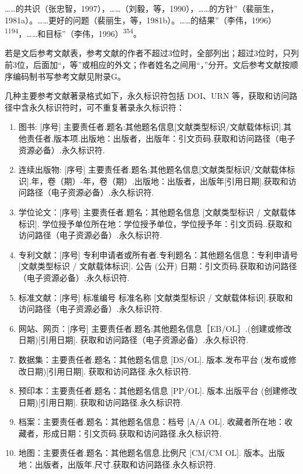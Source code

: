 ……的共识（张忠智，1997），……（刘毅，等，1990），……的方针”（裴丽生，1981a）。……更好的问题（裴丽生，等，1981b）。……的结果”（李伟，1996）\textsuperscript{1194}，……和目标”（李伟，1996）\textsuperscript{354}。

若是文后参考文献表，参考文献的作者不超过3位时，全部列出；超过3位时，只列前3位，后面加“，等”或相应的外文；作者姓名之间用“，”分开。文后参考文献按顺序编码制书写参考文献见附录G。

几种主要参考文献著录格式如下，永久标识符包括 DOI、URN 等，获取和访问路径中含永久标识符时，可不重复著录永久标识符：

\begin{enumerate}
    \item 图书: [序号] 主要责任者.题名:其他题名信息[文献类型标识/文献载体标识].其他责任者.版本项.出版地：出版者，出版年：引文页码.获取和访问路径（电子资源必备）.永久标识符.
    \item 连续出版物: [序号] 主要责任者.题名:其他题名信息[文献类型标识/文献载体标识].年，卷（期）-年，卷（期）.出版地：出版者，出版年[引用日期].获取和访问路径（电子资源必备）.永久标识符.
    \item 学位论文：[序号] 主要责任者.题名：其他题名信息 [文献类型标识 / 文献载体标识]. 学位授予单位所在地：学位授予单位，学位授予年：引文页码..获取和访问路径（电子资源必备）.永久标识符.
    \item 专利文献：[序号] 专利申请者或所有者.专利题名：其他题名信息：专利申请号 [文献类型标识 / 文献载体标识]. 公告 (公开) 日期：引文页码.获取和访问路径（电子资源必备）.永久标识符.
    \item 标准文献：[序号] 标准编号 标准名称 [文献类型标识 / 文献载体标识].获取和访问路径（电子资源必备）.永久标识符.
    \item 网站、网页：[序号] 主要责任者.题名:其他题名信息［EB/OL］.(创建或修改日期)[引用日期]. 获取和访问路径（电子资源必备）.永久标识符.
    \item 数据集：主要责任者.题名：其他题名信息 [DS/OL]. 版本.发布平台 (发布或修改日期)[引用日期]. 获取和访问路径.永久标识符.
    \item 预印本：主要责任者.题名：其他题名信息 [PP/OL]. 版本.出版平台 (创建修改日期)[引用日期]. 获取和访问路径.永久标识符.
    \item 档案：主要责任者.题名：其他题名信息：档号 [A/A OL]. 收藏者所在地：收藏者，形成日期：引文页码.获取和访问路径.永久标识符.
    \item 地图：主要责任者.题名：其他题名信息.比例尺 [CM/CM OL]. 版本。出版地：出版者，出版年.尺寸.获取和访问路径.永久标识符.
\end{enumerate}

